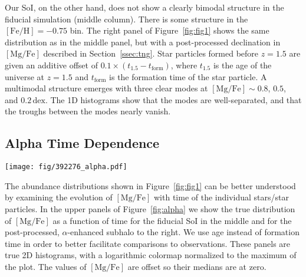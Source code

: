 \documentclass[linenumbers, twocolumn]{aastex631}
\newcommand{\Gyr}{\ensuremath{\textrm{Gyr}}}
\newcommand{\FeH}{\ensuremath{[\textrm{Fe}/\textrm{H}]}}
\newcommand{\MgFe}{\ensuremath{[\textrm{Mg}/\textrm{Fe}]}}
\newcommand{\dex}{\ensuremath{\textrm{dex}}}
\begin{document}
Our SoI, on the other hand, does not show a clearly bimodal structure in the fiducial simulation (middle column). There is some structure in the $\FeH=-0.75$ bin. The right panel of Figure~\ref{fig:fig1} shows the same distribution as in the middle panel, but with a post-processed declination in \MgFe{} described in Section~\ref{ssec:tng}. Star particles formed before $z=1.5$ are given an additive offset of $0.1\times\left(t_{1.5}-t_{\textrm{form}}\right)$, where $t_{1.5}$ is the age of the universe at $z=1.5$ and $t_{\textrm{form}}$ is the formation time of the star particle. A multimodal structure emerges with three clear modes at $\MgFe\sim0.8$, $0.5$, and $0.2\,\dex$. The 1D histograms show that the modes are well-separated, and that the troughs between the modes nearly vanish.

\subsection{Alpha Time Dependence}\label{ssec:alpha_time}

\begin{figure*}
  \centering
  \texttt{[image: fig/392276\_alpha.pdf]}
  \caption{\textbf{Bimodality in the abundance plane is linked to distinct epochs in simulation.} The upper panels show \MgFe{} as a function of age for our subhalo in TNG. The colors indicate stellar populations at fixed values of \FeH{}, which are the same as in Figure~\ref{fig:fig1}. A gap in the relation occurs at an age of approximately $10.6\,\Gyr$, which we indicate with a vertical dashed line. The effect of the $\alpha$-enhancement is clear, as it separates the stars that form before and after this gap in ages (star particles which formed before $z=1.5$ are $\alpha$-enhanced, which occurs at an age of $\sim9.5\,\Gyr$). The lower panels show on the left the Milky Way and on the center and right the data from TNG but with $15\%$ age errors and $0.01\,\dex$ errors in \MgFe{}. When the simulations are given these errors, we see that the before and after star particles smear such that the two populations significantly overlap in ages. In the $\alpha$-enhanced SoI, two populations emerge in each bin which overlapped in the fiducial distribution. This feature more closely resembles the Milky Way, which displays such populations where the bimodality is strongest -- $\FeH=-0.5$ (blue) and $-0.25$ (orange).}
  \label{fig:alpha}
\end{figure*}

The abundance distributions shown in Figure~\ref{fig:fig1} can be better understood by examining the evolution of \MgFe{} with time of the individual stars/star particles. In the upper panels of Figure~\ref{fig:alpha} we show the true distribution of \MgFe{} as a function of time for the fiducial SoI in the middle and for the post-processed, $\alpha$-enhanced subhalo to the right. We use age instead of formation time in order to better facilitate comparisons to observations. These panels are true 2D histograms, with a logarithmic colormap normalized to the maximum of the plot. The values of \MgFe{} are offset so their medians are at zero.
\end{document}
